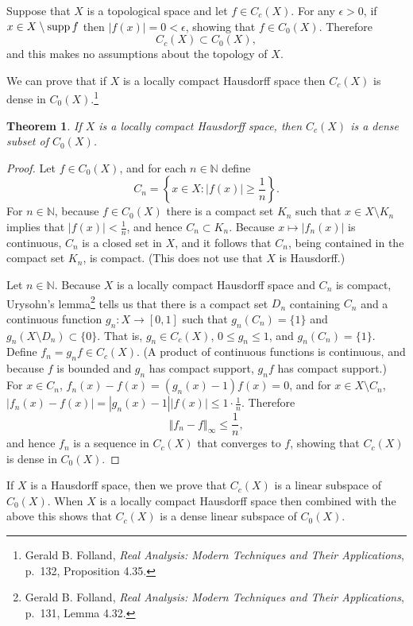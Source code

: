 \documentclass{article}
\newcommand{\supp}{\ensuremath\mathrm{supp}\,}
\newcommand{\norm}[1]{\left\Vert #1 \right\Vert}
\newtheorem{theorem}{Theorem}
\theoremstyle{definition}
\begin{document}
Suppose that $X$ is a topological space and
let $f \in C_c(X)$. For any $\epsilon>0$, if $x \in X \setminus \supp f$ then $|f(x)|=0<\epsilon$, showing that
$f \in C_0(X)$.  Therefore
\[
C_c(X) \subset C_0(X),
\]
and this makes no assumptions about the topology of $X$.

We can prove that if $X$ is a locally compact Hausdorff space then $C_c(X)$ is dense in $C_0(X)$.\footnote{Gerald
B. Folland, {\em Real Analysis: Modern Techniques and Their Applications}, p.~132, Proposition 4.35.}

\begin{theorem}
If $X$ is a locally compact Hausdorff space, then $C_c(X)$ is a dense subset of $C_0(X)$.
\end{theorem}
\begin{proof}
Let $f \in C_0(X)$, 
and for each $n \in \mathbb{N}$
define 
\[
C_n = \left\{x \in X: |f(x)| \geq \frac{1}{n}\right\}.
\]
For  $n \in \mathbb{N}$,
because $f \in C_0(X)$ there is a compact set $K_n$ such that $x \in X \setminus K_n$ implies that
$|f(x)|<\frac{1}{n}$, and hence $C_n \subset K_n$. Because $x \mapsto |f_n(x)|$ is continuous, 
$C_n$ is a closed set in $X$, and it follows that $C_n$, being contained in the compact set $K_n$, is compact. (This does not use that $X$ is Hausdorff.)

Let $n \in \mathbb{N}$. Because $X$ is a locally compact Hausdorff space and $C_n$ is compact, Urysohn's lemma\footnote{Gerald
B. Folland, {\em Real Analysis: Modern Techniques and Their Applications}, p.~131, Lemma 4.32.}  
tells us that there is a compact set $D_n$ containing $C_n$ and a continuous function $g_n:X \to [0,1]$ such that $g_n(C_n)=\{1\}$ and 
$g_n(X \setminus D_n) \subset \{0\}$. That is, $g_n \in C_c(X)$, $0 \leq g_n \leq 1$, and $g_n(C_n)=\{1\}$. Define
$f_n = g_nf \in C_c(X)$. (A product of continuous functions is continuous, and
 because $f$ is  bounded and $g_n$ has compact support, $g_n f$ has compact support.) For $x \in C_n$, $f_n(x)-f(x)=(g_n(x)-1)f(x)=0$, and for $x \in X \setminus C_n$,
$|f_n(x)-f(x)|=|g_n(x)-1| |f(x)| \leq 1\cdot \frac{1}{n}$.  Therefore
\[
\norm{f_n-f}_\infty \leq \frac{1}{n},
\]
and hence $f_n$ is a sequence in $C_c(X)$ that converges to $f$, showing that $C_c(X)$ is dense in $C_0(X)$. 
\end{proof}


If $X$ is a Hausdorff space, then we prove that $C_c(X)$ is a linear subspace of $C_0(X)$. When $X$ is a locally compact Hausdorff
space then combined with the above this shows that $C_c(X)$ is a dense linear subspace of $C_0(X)$. 
\end{document}
